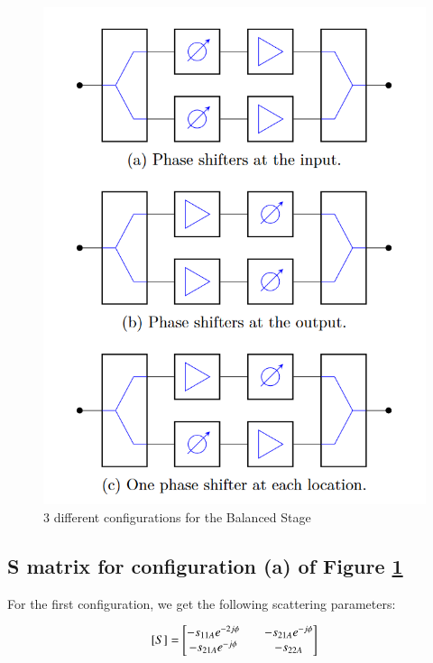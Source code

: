 \documentclass[12pt]{report} %
\begin{document}
\begin{figure}[htbp]
    \centering
    \includegraphics[width=\textwidth]{images/design_circuit_elements/configurations_balanced_stage.png}
    \caption{3 different configurations for the Balanced Stage}
    \label{fig:design_circuit_elements:configurations_balanced_stage}
\end{figure}

\subsection{S matrix for configuration (a) of Figure \ref{fig:design_circuit_elements:configurations_balanced_stage}}

For the first configuration, we get the following scattering parameters:

\[
[S] = \begin{bmatrix}
- s_{11A} \* e^{-2 \* j \* \phi} & \quad - s_{21A} \* e^{- j \* \phi} \\
- s_{21A} \* e^{- j \* \phi} & \quad - s_{22A} \\
\end{bmatrix}
\]
\end{document}
